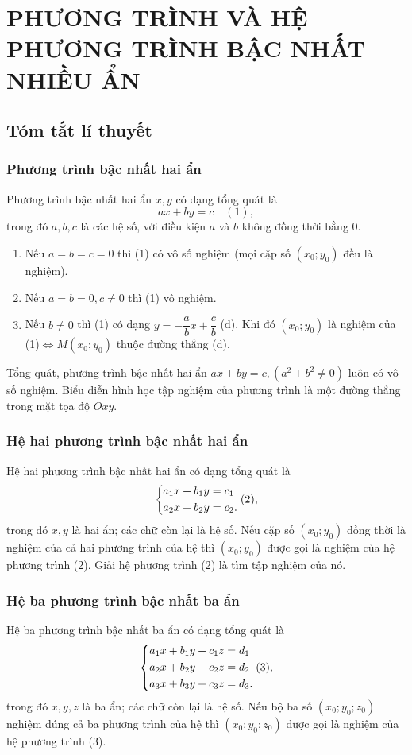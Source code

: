 \section{PHƯƠNG TRÌNH VÀ HỆ PHƯƠNG TRÌNH BẬC NHẤT NHIỀU ẨN}
\subsection{Tóm tắt lí thuyết}
\subsubsection{Phương trình bậc nhất hai ẩn}
\begin{kn}
Phương trình bậc nhất hai ẩn $x, y$ có dạng tổng quát là 
$$ax+by=c\quad (1),$$
trong đó $a,b,c$ là các hệ số, với điều kiện $a$ và $b$ không đồng thời bằng $0$. 
\end{kn}
\begin{note}
\begin{enumerate}
\item Nếu $a=b=c=0$ thì (1) có vô số nghiệm (mọi cặp số $(x_0;y_0)$ đều là nghiệm).
\item Nếu $a=b=0, c\neq 0$ thì (1) vô nghiệm.
\item Nếu $b\neq 0$ thì (1) có dạng $y=-\dfrac{a}{b}x+\dfrac{c}{b}$ (d). Khi đó $(x_0;y_0)$ là nghiệm của (1)$\Leftrightarrow M(x_0;y_0)$ thuộc đường thẳng (d). 
\end{enumerate}
Tổng quát, phương trình bậc nhất hai ẩn $ax+by=c, (a^2+b^2\neq 0)$ luôn có vô số nghiệm. Biểu diễn hình học tập nghiệm của phương trình là một đường thẳng trong mặt tọa độ $Oxy$. 
\end{note}
\subsubsection{Hệ hai phương trình bậc nhất hai ẩn}
\begin{kn}
Hệ hai phương trình bậc nhất hai ẩn có dạng tổng quát là 
$$\left\{\begin{aligned}& a_1x+b_1y=c_1\\& a_2x+b_2y=c_2.\end{aligned}\right. (2),$$
trong đó $x,y$ là hai ẩn; các chữ còn lại là hệ số. Nếu cặp số $(x_0;y_0)$ đồng thời là nghiệm của cả hai phương trình của hệ thì $(x_0;y_0)$ được gọi là nghiệm của hệ phương trình (2). Giải hệ phương trình (2) là tìm tập nghiệm của nó.
\end{kn}
\subsubsection{Hệ ba phương trình bậc nhất ba ẩn}
\begin{kn}
Hệ ba phương trình bậc nhất ba ẩn có dạng tổng quát là 
$$\left\{\begin{aligned}& a_1x+b_1y+c_1z=d_1\\& a_2x+b_2y+c_2z=d_2\\& a_3x+b_3y+c_3z=d_3.\end{aligned}\right. (3),$$
trong đó $x,y,z$ là ba ẩn; các chữ còn lại là hệ số. Nếu bộ ba số $(x_0;y_0;z_0)$ nghiệm đúng cả ba phương trình của hệ thì $(x_0;y_0;z_0)$ được gọi là nghiệm của hệ phương trình (3).
\end{kn}
